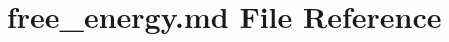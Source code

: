 \hypertarget{free__energy_8md}{\section{free\-\_\-energy.\-md File Reference}
\label{free__energy_8md}
}
